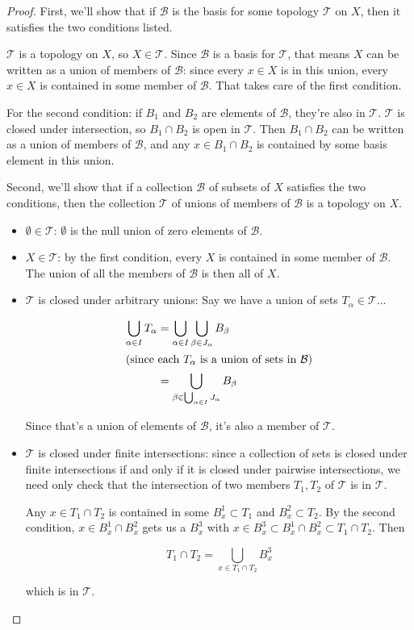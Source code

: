 \documentclass[12pt]{article}
\theoremstyle{definition}
\begin{document}
\begin{proof}
First, we'll show that if $\mathcal{B}$ is the basis for some topology $\mathcal{T}$ on $X$, then it satisfies the two conditions listed.

$\mathcal{T}$ is a topology on $X$, so $X\in \mathcal{T}$.  Since $\mathcal{B}$ is a basis for $\mathcal{T}$, that means $X$ can be written as a union of members of $\mathcal{B}$: since every $x\in X$ is in this union, every $x\in X$ is contained in some member of $\mathcal{B}$.  That takes care of the first condition.

For the second condition: if $B_1$ and $B_2$ are elements of $\mathcal{B}$, they're also in $\mathcal{T}$.  $\mathcal{T}$ is closed under intersection, so $B_1\cap B_2$ is open in $\mathcal{T}$.  Then $B_1\cap B_2$ can be written as a union of members of $\mathcal{B}$, and any $x\in B_1\cap B_2$ is contained by some basis element in this union.

Second, we'll show that if a collection $\mathcal{B}$ of subsets of $X$ satisfies the two conditions, then the collection $\mathcal{T}$ of unions of members of $\mathcal{B}$ is a topology on $X$.

\begin{itemize}
\item
$\emptyset \in \mathcal{T}$: $\emptyset$ is the null union of zero elements of $\mathcal{B}$.

\item
$X\in \mathcal{T}$: by the first condition, every $X$ is contained in some member of $\mathcal{B}$.  The union of all the members of $\mathcal{B}$ is then all of $X$.

\item
$\mathcal{T}$ is closed under arbitrary unions: Say we have a union of sets $T_{\alpha}\in \mathcal{T}$...

\begin{align*}
\bigcup_{\alpha \in I} T_{\alpha} &= \bigcup_{\alpha \in I} \bigcup_{\beta \in J_{\alpha}} B_{\beta} \\
\intertext{(since each $T_{\alpha}$ is a union of sets in $\mathcal{B}$)}
&= \bigcup_{\beta \in \bigcup_{\alpha \in I} J_{\alpha}} B_{\beta}
\end{align*}

Since that's a union of elements of $\mathcal{B}$, it's also a member of $\mathcal{T}$.

\item
$\mathcal{T}$ is closed under finite intersections: since a collection of sets is closed under finite intersections if and only if it is closed under pairwise intersections, we need only check that the intersection of two members $T_1, T_2$ of $\mathcal{T}$ is in $\mathcal{T}$.

Any $x\in T_1\cap T_2$ is contained in some $B_x^1\subset T_1$ and $B_x^2\subset T_2$.  By the second condition, $x\in B_x^1\cap B_x^2$ gets us a $B_x^3$ with $x\in B_x^3 \subset B_x^1\cap B_x^2 \subset T_1\cap T_2$.  Then

\[ T_1\cap T_2 = \bigcup_{x\in T_1\cap T_2} B_x^3 \]

which is in $\mathcal{T}$.
\end{itemize}

\end{proof}
\end{document}
